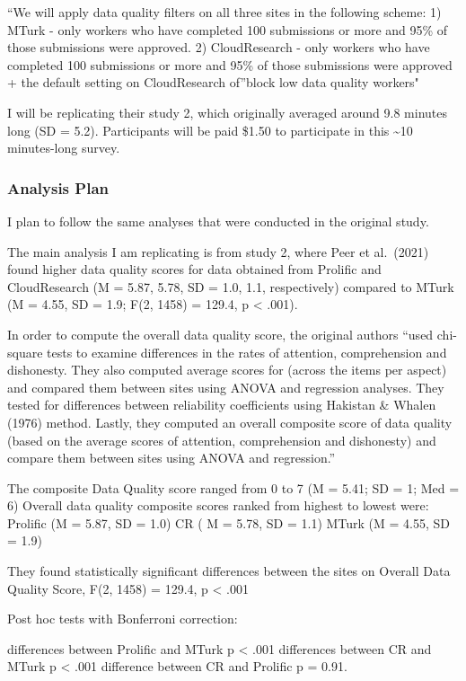 \documentclass[
]{article}
\begin{document}
``We will apply data quality filters on all three sites in the following
scheme: 1) MTurk - only workers who have completed 100 submissions or
more and 95\% of those submissions were approved. 2) CloudResearch -
only workers who have completed 100 submissions or more and 95\% of
those submissions were approved + the default setting on CloudResearch
of''block low data quality workers"

I will be replicating their study 2, which originally averaged around
9.8 minutes long (SD = 5.2). Participants will be paid \$1.50 to
participate in this \textasciitilde10 minutes-long survey.

\hypertarget{analysis-plan}{%
\subsubsection{Analysis Plan}\label{analysis-plan}}

I plan to follow the same analyses that were conducted in the original
study.

The main analysis I am replicating is from study 2, where Peer et
al.~(2021) found higher data quality scores for data obtained from
Prolific and CloudResearch (M = 5.87, 5.78, SD = 1.0, 1.1, respectively)
compared to MTurk (M = 4.55, SD = 1.9; F(2, 1458) = 129.4, p \textless{}
.001).

In order to compute the overall data quality score, the original authors
``used chi-square tests to examine differences in the rates of
attention, comprehension and dishonesty. They also computed average
scores for (across the items per aspect) and compared them between sites
using ANOVA and regression analyses. They tested for differences between
reliability coefficients using Hakistan \& Whalen (1976) method. Lastly,
they computed an overall composite score of data quality (based on the
average scores of attention, comprehension and dishonesty) and compare
them between sites using ANOVA and regression.''

The composite Data Quality score ranged from 0 to 7 (M = 5.41; SD = 1;
Med = 6) Overall data quality composite scores ranked from highest to
lowest were: Prolific (M = 5.87, SD = 1.0) CR ( M = 5.78, SD = 1.1)
MTurk (M = 4.55, SD = 1.9)

They found statistically significant differences between the sites on
Overall Data Quality Score, F(2, 1458) = 129.4, p \textless{} .001

Post hoc tests with Bonferroni correction:

differences between Prolific and MTurk p \textless{} .001 differences
between CR and MTurk p \textless{} .001 difference between CR and
Prolific p = 0.91.
\end{document}
